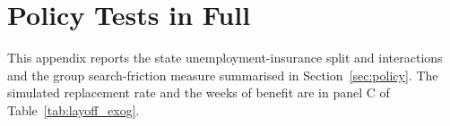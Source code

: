 \section{Policy Tests in Full}\label{app:policy}

This appendix reports the state unemployment-insurance split and interactions and the group search-friction measure
summarised in Section~\ref{sec:policy}. The simulated replacement rate and the weeks of benefit are in panel C of
Table~\ref{tab:layoff_exog}.



